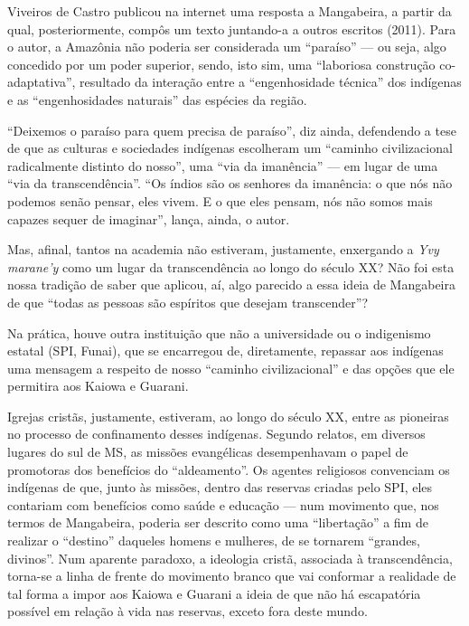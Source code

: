 Viveiros de Castro publicou na internet uma resposta a Mangabeira, a
partir da qual, posteriormente, compôs um texto juntando-a a outros
escritos (2011). Para o autor, a Amazônia não poderia ser considerada um
``paraíso'' --- ou seja, algo concedido por um poder superior, sendo,
isto sim, uma ``laboriosa construção co-adaptativa'', resultado da
interação entre a ``engenhosidade técnica'' dos indígenas e as
``engenhosidades naturais'' das espécies da região.

``Deixemos o paraíso para quem precisa de paraíso'', diz ainda,
defendendo a tese de que as culturas e sociedades indígenas escolheram
um ``caminho civilizacional radicalmente distinto do nosso'', uma ``via
da imanência'' --- em lugar de uma ``via da transcendência''. ``Os
índios são os senhores da imanência: o que nós não podemos senão pensar,
eles vivem. E o que eles pensam, nós não somos mais capazes sequer de
imaginar'', lança, ainda, o autor.

Mas, afinal, tantos na academia não estiveram, justamente, enxergando a
\emph{Yvy marane'y} como um lugar da transcendência ao longo do século
XX? Não foi esta nossa tradição de saber que aplicou, aí, algo parecido
a essa ideia de Mangabeira de que ``todas as pessoas são espíritos que
desejam transcender''?

Na prática, houve outra instituição que não a universidade ou o
indigenismo estatal (SPI, Funai), que se encarregou de, diretamente,
repassar aos indígenas uma mensagem a respeito de nosso ``caminho
civilizacional'' e das opções que ele permitira aos Kaiowa e Guarani.

Igrejas cristãs, justamente, estiveram, ao longo do século XX, entre as
pioneiras no processo de confinamento desses indígenas. Segundo relatos,
em diversos lugares do sul de MS, as missões evangélicas desempenhavam o
papel de promotoras dos benefícios do ``aldeamento''. Os agentes
religiosos convenciam os indígenas de que, junto às missões, dentro das
reservas criadas pelo SPI, eles contariam com benefícios como saúde e
educação --- num movimento que, nos termos de Mangabeira, poderia ser
descrito como uma ``libertação'' a fim de realizar o ``destino''
daqueles homens e mulheres, de se tornarem ``grandes, divinos''. Num
aparente paradoxo, a ideologia cristã, associada à transcendência,
torna-se a linha de frente do movimento branco que vai conformar a
realidade de tal forma a impor aos Kaiowa e Guarani a ideia de que não
há escapatória possível em relação à vida nas reservas, exceto fora
deste mundo.

